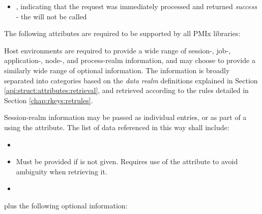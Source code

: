 \returnsimplenb

\returnstart
\begin{itemize}
    \item {}, indicating that the request was immediately processed and returned \textit{success} - the  will not be called
\end{itemize}
\returnend

\reqattrstart
The following attributes are required to be supported by all \ac{PMIx} libraries:


\divider

Host environments are required to provide a wide range of session-, job-, application-, node-, and process-realm information, and may choose to provide a similarly wide range of optional information. The information is broadly separated into categories based on the \emph{data realm} definitions explained in Section \ref{api:struct:attributes:retrieval}, and retrieved according to the rules detailed in Section \ref{chap:rkeys:retrules}.

Session-realm information may be passed as individual  entries, or as part of a  using the  attribute. The list of data referenced in this way shall include:

\begin{itemize}
    \item {}
    \item {}Must be provided if  is not given. Requires use of the  attribute to avoid ambiguity when retrieving it.
    \pasteAttributeItemEnd
    \item {}
\end{itemize}

plus the following optional information:

